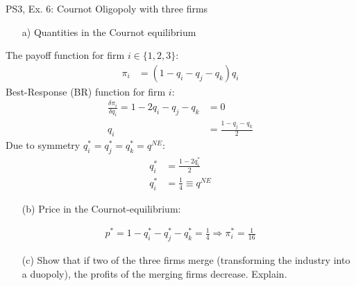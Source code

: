 \begin{frame}{PS3, Ex. 6: Cournot Oligopoly with three firms}
  \begin{multicols}{2}
    \begin{itemize}
      \item[a)] Quantities in the Cournot equilibrium
    \end{itemize}
    The payoff function for firm $i\in\{1,2,3\}$:
    \begin{align*}
        \pi_i&=(1-q_i-q_j-q_k)q_i
    \end{align*}
    Best-Response (BR) function for firm $i$:
    \begin{align*}
        \frac{\delta\pi_i}{\delta q_i}=1-2q_i-q_j-q_k&=0\\
                                                  q_i&=\frac{1-q_j-q_k}{2}
    \end{align*}
    Due to symmetry $q_i^{*}=q_j^{*}=q_k^{*}=q^{NE}$:
    \begin{align*}
        q_i^{*} &= \frac{1-2q_i^{*}}{2}\\
        q_i^{*} &= \frac{1}{4}\equiv q^{NE}
    \end{align*}
    \begin{itemize}
      \item[(b)] Price in the Cournot-equilibrium:
    \end{itemize}
    \begin{align*}
      p^{*}=1-q_i^{*}-q_j^{*}-q_k^{*}=\frac{1}{4}\Rightarrow\pi_i^{*}=\frac{1}{16}
    \end{align*}
  \vfill\null \columnbreak
    \begin{itemize}
      \item[(c)] Show that if two of the three firms merge (transforming the industry into a duopoly), the profits of the merging firms decrease. Explain.
    \end{itemize}
  \vfill\null
  \end{multicols}
\end{frame}
